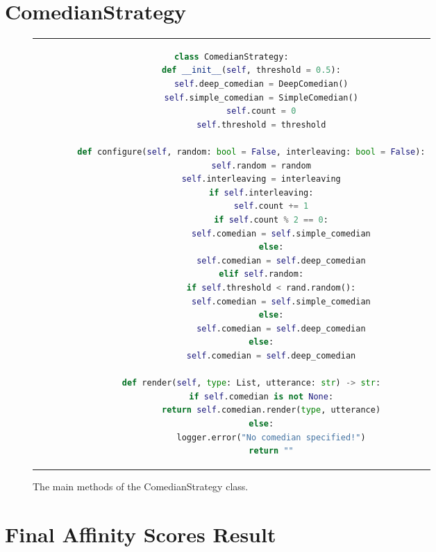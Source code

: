 \chapter{ComedianStrategy}\label{appendix:comedian}

\begin{figure}[htpb]
  \centering
  \begin{tabular}{c}
  \begin{lstlisting}[language=python]
    class ComedianStrategy:
        def __init__(self, threshold = 0.5):
            self.deep_comedian = DeepComedian()
            self.simple_comedian = SimpleComedian()
            self.count = 0
            self.threshold = threshold
    
        def configure(self, random: bool = False, interleaving: bool = False):
            self.random = random
            self.interleaving = interleaving
            if self.interleaving:
                self.count += 1
                if self.count % 2 == 0:
                    self.comedian = self.simple_comedian
                else:
                    self.comedian = self.deep_comedian
            elif self.random:
                if self.threshold < rand.random():
                    self.comedian = self.simple_comedian
                else:
                    self.comedian = self.deep_comedian
            else:
                self.comedian = self.deep_comedian
    
        def render(self, type: List, utterance: str) -> str:
            if self.comedian is not None:
                return self.comedian.render(type, utterance)
            else:
                logger.error("No comedian specified!")
                return ""
  \end{lstlisting}
  \end{tabular}
  \caption{The main methods of the ComedianStrategy class.}\label{fig:comedianstrategylist}
\end{figure}

\chapter{Final Affinity Scores Result}\label{appendix:finalscores}

